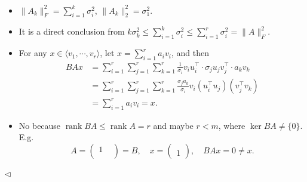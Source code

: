 ﻿\documentclass[11pt]{article}
\newenvironment{answer}[1][Answer]{\begin{trivlist}
\item[\hskip \labelsep {\bfseries #1.}\hskip \labelsep]}{\hfill$\lhd$\end{trivlist}}
\begin{document}
\begin{answer} ~
\begin{itemize}
    \item[(1)] $\|A_k\|_F^2=\sum_{i=1}^k\sigma_i^2$, $\|A_k\|_2^2=\sigma_1^2$.
    \item[(2)] It is a direct conclusion from $k\sigma_k^2 \le \sum_{i=1}^k \sigma_i^2 \le \sum_{i=1}^r\sigma_i^2 = \|A\|_F^2$.
    \item[(3-a)] For any $x\in\langle v_1,\cdots,v_r \rangle$, let $x=\sum_{i=1}^r a_iv_i$, and then
    $$
        \begin{aligned}
            BAx &= \sum_{i=1}^r\sum_{j=1}^r\sum_{k=1}^r \frac{1}{\sigma_i}v_iu_i^\intercal \cdot \sigma_j u_j v_j^\intercal \cdot a_k v_k\\
            &= \sum_{i=1}^r\sum_{j=1}^r\sum_{k=1}^r\frac{\sigma_j a_k}{\sigma_i}v_i(u_i^\intercal u_j)(v_j^\intercal v_k)\\
            &= \sum_{i=1}^r a_iv_i = x.
        \end{aligned}
    $$
    \item[(3-b)] No because $\operatorname{rank}BA\le\operatorname{rank}A=r$ and maybe $r<m$, where $\ker BA\neq\{0\}$. E.g.
    $$
        A=\begin{pmatrix}1\\&\end{pmatrix}=B,\quad x=\begin{pmatrix}\\1\end{pmatrix},\quad
        BAx=0\neq x.
    $$
\end{itemize}
\end{answer}
\end{document}

